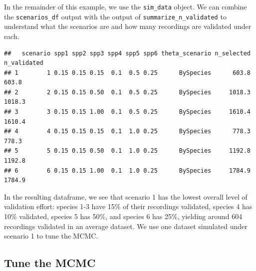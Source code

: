 \documentclass[
]{article}
\newenvironment{Shaded}{\begin{snugshade}}{\end{snugshade}}
\newcommand{\AttributeTok}[1]{\textcolor[rgb]{0.13,0.29,0.53}{#1}}
\newcommand{\DecValTok}[1]{\textcolor[rgb]{0.00,0.00,0.81}{#1}}
\newcommand{\FunctionTok}[1]{\textcolor[rgb]{0.13,0.29,0.53}{\textbf{#1}}}
\newcommand{\NormalTok}[1]{#1}
\newcommand{\OtherTok}[1]{\textcolor[rgb]{0.56,0.35,0.01}{#1}}
\newcommand{\SpecialCharTok}[1]{\textcolor[rgb]{0.81,0.36,0.00}{\textbf{#1}}}
\newcommand{\StringTok}[1]{\textcolor[rgb]{0.31,0.60,0.02}{#1}}
\begin{document}
\linespread{1}

In the remainder of this example, we use the \texttt{sim\_data} object.
We can combine the \texttt{scenarios\_df} output with the output of \texttt{summarize\_n\_validated} to understand what the scenarios are and how many recordings are validated under each.

\linespread{1}

\begin{Shaded}
\end{Shaded}

\begin{verbatim}
##   scenario spp1 spp2 spp3 spp4 spp5 spp6 theta_scenario n_selected n_validated
## 1        1 0.15 0.15 0.15  0.1  0.5 0.25      BySpecies      603.8       603.8
## 2        2 0.15 0.15 0.50  0.1  0.5 0.25      BySpecies     1018.3      1018.3
## 3        3 0.15 0.15 1.00  0.1  0.5 0.25      BySpecies     1610.4      1610.4
## 4        4 0.15 0.15 0.15  0.1  1.0 0.25      BySpecies      778.3       778.3
## 5        5 0.15 0.15 0.50  0.1  1.0 0.25      BySpecies     1192.8      1192.8
## 6        6 0.15 0.15 1.00  0.1  1.0 0.25      BySpecies     1784.9      1784.9
\end{verbatim}

\linespread{1}

In the resulting dataframe, we see that scenario 1 has the lowest overall level of validation effort: species 1-3 have 15\% of their recordings validated, species 4 has 10\% validated, species 5 has 50\%, and species 6 has 25\%, yielding around 604 recordings validated in an average dataset. We use one dataset simulated under scenario 1 to tune the MCMC.

\subsection{Tune the MCMC}\label{tune-the-mcmc}
\end{document}
